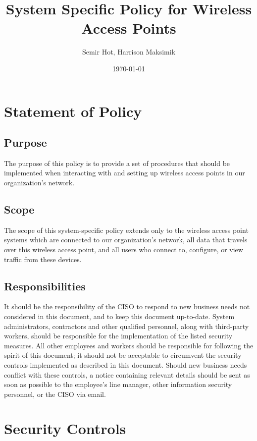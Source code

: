 \documentclass[11pt]{article}
\author{Semir Hot, Harrison Maksimik}
\date{\today}
\title{System Specific Policy for Wireless Access Points}
\begin{document}
\maketitle
\tableofcontents

\section{Statement of Policy}
\label{sec:org042cfb8}
\subsection{Purpose}
\label{sec:org8c61a6a}
The purpose of this policy is to provide a set of procedures that should be implemented when interacting with and setting up wireless access points in our organization's network. 

\subsection{Scope}
\label{sec:org368d8dd}
The scope of this system-specific policy extends only to the wireless access point systems which are connected to our organization's network, all data that travels over this wireless access point, and all users who connect to, configure, or view traffic from these devices.

\subsection{Responsibilities}
\label{sec:orgeb44f31}
It should be the responsibility of the CISO to respond to new business needs not considered in this document, and to keep this document up-to-date. System administrators, contractors and other qualified personnel, along with third-party workers, should be responsible for the implementation of the listed security measures. All other employees and workers should be responsible for following the spirit of this document; it should not be acceptable to circumvent the security controls implemented as described in this document. Should new business needs conflict with these controls, a notice containing relevant details should be sent as soon as possible to the employee's line manager, other information security personnel, or the CISO via email.

\section{Security Controls}
\label{sec:orgf93bb86}
\end{document}
